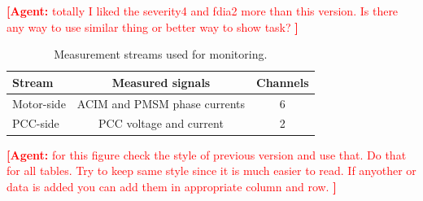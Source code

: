 \documentclass[letterpaper,journal]{IEEEtran}
\newcommand{\agent}[1]{%
    \textcolor{red}{\textbf{[Agent:} #1\textbf{]}}%
}
\begin{document}
\agent{totally I liked the severity4 and fdia2 more than this version. Is there any way to use similar thing or better way to show task? }
\begin{table}[t]
\centering
\caption{Measurement streams used for monitoring.}
\label{tab:measurement_streams}
\renewcommand{\arraystretch}{1.15}
\begin{tabular}{l c c}
\hline
Stream & Measured signals & Channels \\
\hline
Motor-side & ACIM and PMSM phase currents & 6 \\
PCC-side   & PCC voltage and current & 2 \\
\hline
\end{tabular}
\end{table}                       

\agent{for this figure check the style of previous version and use that. Do that for all tables. Try to keep same style since it is much easier to read. If anyother or data is added you can add them in appropriate column and row. }
\end{document}
